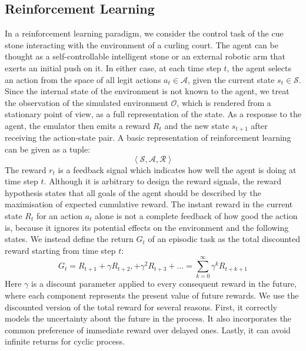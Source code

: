 \documentclass[oneside,11pt,a4paper]{article}
\begin{document}
\subsection{Reinforcement Learning}
In a reinforcement learning paradigm, we consider the control task of the cue stone interacting with the environment of a curling court. The agent can be thought as a self-controllable intelligent stone or an external robotic arm that exerts an initial push on it. In either case, at each time step $t$, the agent selects an action from the space of all legit actions $a_t \in\mathcal A$, given the current state $s_t \in \mathcal S$. Since the internal state of the environment is not known to the agent, we treat the observation of the simulated environment $\mathcal O$, which is rendered from a stationary point of view, as a full representation of the state. As a response to the agent, the emulator then emits a reward $R_t$ and the new state $s_{t+1}$ after receiving the action-state pair. A basic representation of reinforcement learning can be given as a tuple:
$$
\left\langle \mathcal {S,A, R} \right\rangle
$$
The reward $r_t$ is a feedback signal which indicates how well the agent is doing at time step $t$. Although it is arbitrary to design the reward signals, the reward hypothesis states that all goals of the agent should be described by the maximisation of expected cumulative reward. The instant reward in the current state $R_t$ for an action $a_t$ alone is not a complete feedback of how good the action is, because it ignores its potential effects on the environment and the following states. We instead define the return $G_t$ of an episodic task as the total discounted reward starting from time step $t$:
$$
G_t = R_{t+1} + \gamma R_{t+2}, +\gamma^2 R_{t+3}+... = \sum_{k=0}^\infty\gamma^kR_{t+k+1}
$$
Here $\gamma$ is a discount parameter applied to every consequent reward in the future, where each component represents the present value of future rewards. We use the discounted version of the total reward for several reasons. First, it correctly models the uncertainty about the future in the process. It also incorporates the common preference of immediate reward over delayed ones. Lastly, it can avoid infinite returns for cyclic process. \cite{ds}
\newline
\newline
\noindent
\end{document}
